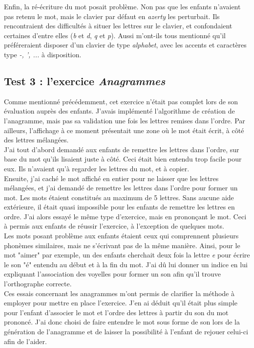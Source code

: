Enfin, la ré-écriture du mot posait problème. Non pas que les enfants n'avaient pas retenu le mot, mais le clavier par défaut en \textit{azerty} les perturbait. Ils rencontraient des difficultés à situer les lettres sur le clavier, et confondaient certaines d'entre elles (\textit{b} et \textit{d}, \textit{q} et \textit{p}). Aussi m'ont-ils tous mentionné qu'il préféreraient disposer d'un clavier de type \textit{alphabet}, avec les accents et caractères type \textit{-, ', ...} à disposition.

\subsection{Test 3 : l'exercice \textit{Anagrammes}\label{testAna}}
Comme mentionné précédemment, cet exercice n'était pas complet lors de son évaluation auprès des enfants. J'avais implémenté l'algorithme de création de l'anagramme, mais pas sa validation une fois les lettres remises dans l'ordre. Par ailleurs, l'affichage à ce moment présentait une zone où le mot était écrit, à côté des lettres mélangées.\\

J'ai tout d'abord demandé aux enfants de remettre les lettres dans l'ordre, sur base du mot qu'ils lisaient juste à côté. Ceci était bien entendu trop facile pour eux. Ils n'avaient qu'à regarder les lettres du mot, et à copier.\\

Ensuite, j'ai caché le mot affiché en entier pour ne laisser que les lettres mélangées, et j'ai demandé de remettre les lettres dans l'ordre pour former un mot. Les mots étaient constitués au maximum de 5 lettres. Sans aucune aide extérieure, il était quasi impossible pour les enfants de remettre les lettres en ordre. J'ai alors essayé le même type d'exercice, mais en prononçant le mot. Ceci à permis aux enfants de réussir l'exercice, à l'exception de quelques mots.\\

Les mots posant problème aux enfants étaient ceux qui comprennent plusieurs phonèmes similaires, mais ne s'écrivant pas de la même manière. Ainsi, pour le mot "aimer" par exemple, un des enfants cherchait deux fois la lettre \textit{e} pour écrire le son "é" entendu au début et à la fin du mot. J'ai dû lui donner un indice en lui expliquant l'association des voyelles pour former un son afin qu'il trouve l'orthographe correcte.\\

Ces essais concernant les anagrammes m'ont permis de clarifier la méthode à employer pour mettre en place l'exercice. J'en ai déduit qu'il était plus simple pour l'enfant d'associer le mot et l'ordre des lettres à partir du son du mot prononcé. J'ai donc choisi de faire entendre le mot sous forme de son lors de la génération de l'anagramme et de laisser la possibilité à l'enfant de rejouer celui-ci afin de l'aider.

